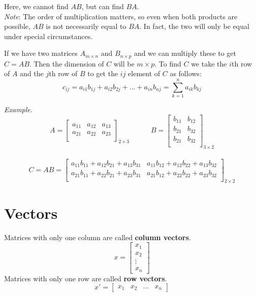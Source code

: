 \documentclass{./../../latex/handout}
\begin{document}
Here, we cannot find $AB$, but can find $BA$. \\

\textit{Note}: The order of multiplication matters, so even when both products are possible, $AB$ is not necessarily equal to $BA$. In fact, the two will only be equal under special circumstances. 

If we have two matrices $A_{m \times n}$ and $B_{n \times p}$ and we can multiply these to get $C=AB$. Then the dimension of $C$ will be $m \times p$. To find $C$ we take the $i$th row of $A$ and the $j$th row of $B$ to get the $ij$ element of $C$ as follows:
\[ c_{ij} = a_{i1} b_{1j} + a_{i2} b_{2j} + ... + a_{in} b_{nj} = \sum_{k=1}^n a_{ik} b_{kj}   \]

\textit{Example.}
\[A = \begin{bmatrix}
a_{11} & a_{12} &  a_{13} \\
a_{21} & a_{22} &  a_{23} \\
\end{bmatrix}_{2 \times 3} \quad \quad \quad
B = \begin{bmatrix}
b_{11} & b_{12} \\
b_{21} & b_{32} \\
b_{21} & b_{32} \\
\end{bmatrix}_{3 \times 2}\] \\
\[C = AB = \begin{bmatrix}
 a_{11}b_{11} +  a_{12}b_{21} + a_{13}b_{31} &  a_{11}b_{12} +  a_{12}b_{22} + a_{13}b_{32} \\
  a_{21}b_{11} +  a_{22}b_{21} + a_{23}b_{31} &  a_{21}b_{12} +  a_{22}b_{22} + a_{23}b_{32} \\
\end{bmatrix}_{2 \times 2} \]


\section{Vectors}

Matrices with only one column are called \textbf{column vectors}. 
\[ x =  \begin{bmatrix}
x_1\\
x_2 \\
\vdots \\
x_n
\end{bmatrix} \]
 Matrices with only one row are called \textbf{row vectors}.
\[ x' =  \begin{bmatrix}
x_1 &
x_2 & \hdots &
x_n
\end{bmatrix} \]
\end{document}
